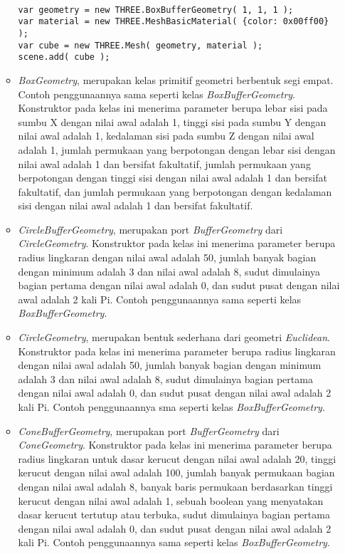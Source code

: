 \begin{itemize}
\begin{itemize}
\begin{lstlisting}[caption={Contoh penggunaan kelas {\it BoxBufferGeometry}.},captionpos=b]

var geometry = new THREE.BoxBufferGeometry( 1, 1, 1 );
var material = new THREE.MeshBasicMaterial( {color: 0x00ff00} );
var cube = new THREE.Mesh( geometry, material );
scene.add( cube );
\end{lstlisting}

	\item {\it BoxGeometry}, merupakan kelas primitif geometri berbentuk segi empat. Contoh penggunaannya sama seperti kelas {\it BoxBufferGeometry}. Konstruktor pada kelas ini menerima parameter berupa lebar sisi pada sumbu X dengan nilai awal adalah 1, tinggi sisi pada sumbu Y dengan nilai awal adalah 1, kedalaman sisi pada sumbu Z dengan nilai awal adalah 1, jumlah permukaan yang berpotongan dengan lebar sisi dengan nilai awal adalah 1 dan bersifat fakultatif,  jumlah permukaan yang berpotongan dengan tinggi sisi dengan nilai awal adalah 1 dan bersifat fakultatif,  dan jumlah permukaan yang berpotongan dengan kedalaman sisi dengan nilai awal adalah 1 dan bersifat fakultatif.
	
	\item {\it CircleBufferGeometry}, merupakan port {\it BufferGeometry} dari {\it CircleGeometry}. Konstruktor pada kelas ini menerima parameter berupa radius lingkaran dengan nilai awal adalah 50, jumlah banyak bagian dengan minimum adalah 3 dan nilai awal adalah 8, sudut dimulainya bagian pertama dengan nilai awal adalah 0, dan sudut pusat dengan nilai awal adalah 2 kali Pi. Contoh penggunaannya sama seperti kelas {\it BoxBufferGeometry}.

	\item {\it CircleGeometry}, merupakan bentuk sederhana dari geometri {\it Euclidean}. Konstruktor pada kelas ini menerima parameter berupa radius lingkaran dengan nilai awal adalah 50, jumlah banyak bagian dengan minimum adalah 3 dan nilai awal adalah 8, sudut dimulainya bagian pertama dengan nilai awal adalah 0, dan sudut pusat dengan nilai awal adalah 2 kali Pi. Contoh penggunaannya sma seperti kelas {\it BoxBufferGeometry}.
	
	\item {\it ConeBufferGeometry}, merupakan port {\it BufferGeometry} dari {\it ConeGeometry}. Konstruktor pada kelas ini menerima parameter berupa radius lingkaran untuk dasar kerucut dengan nilai awal adalah 20, tinggi kerucut dengan nilai awal adalah 100, jumlah banyak permukaan bagian dengan nilai awal adalah 8, banyak baris permukaan berdasarkan tinggi kerucut dengan nilai awal adalah 1, sebuah boolean yang menyatakan dasar kerucut tertutup atau terbuka, sudut dimulainya bagian pertama dengan nilai awal adalah 0, dan sudut pusat dengan nilai awal adalah 2 kali Pi. Contoh penggunaannya sama seperti kelas {\it BoxBufferGeometry}.
	

\end{itemize}
\end{itemize}
